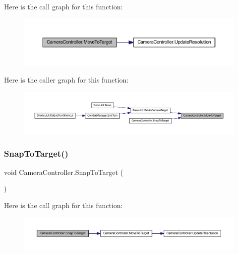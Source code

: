 Here is the call graph for this function\+:
\nopagebreak
\begin{figure}[H]
\begin{center}
\leavevmode
\includegraphics[width=350pt]{class_camera_controller_a79831008bb764801df46a3c91343a524_cgraph}
\end{center}
\end{figure}
Here is the caller graph for this function\+:
\nopagebreak
\begin{figure}[H]
\begin{center}
\leavevmode
\includegraphics[width=350pt]{class_camera_controller_a79831008bb764801df46a3c91343a524_icgraph}
\end{center}
\end{figure}
\mbox{\label{class_camera_controller_a9e2d7df7c696c1c2ce48384933c5d1ab}} 
\subsubsection{\texorpdfstring{SnapToTarget()}{SnapToTarget()}}
{\footnotesize\ttfamily void Camera\+Controller.\+Snap\+To\+Target (\begin{DoxyParamCaption}{ }\end{DoxyParamCaption})}

Here is the call graph for this function\+:
\nopagebreak
\begin{figure}[H]
\begin{center}
\leavevmode
\includegraphics[width=350pt]{class_camera_controller_a9e2d7df7c696c1c2ce48384933c5d1ab_cgraph}
\end{center}
\end{figure}
\mbox{\label{class_camera_controller_a4894dc3111b871a8bf5ff422d30c1689}} 
